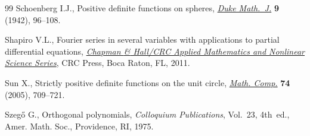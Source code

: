 \documentclass[pdftex]{sigma}
\numberwithin{equation}{section}
\begin{document}
\begin{thebibliography}{99}
Schoenberg I.J., Positive def\/inite functions on spheres, \href{http://dx.doi.org/10.1215/S0012-7094-42-00908-6}{\textit{Duke Math.~J.}}
 \textbf{9} (1942), 96--108.

Shapiro V.L., Fourier series in several variables with applications to partial
 dif\/ferential equations, \href{http://dx.doi.org/10.1201/b10811}{\textit{Chapman {\rm \&} Hall/CRC Applied Mathematics and Nonlinear
 Science Series}}, CRC Press, Boca Raton, FL, 2011.

Sun X., Strictly positive def\/inite functions on the unit circle, \href{http://dx.doi.org/10.1090/S0025-5718-04-01668-0}{\textit{Math.
 Comp.}} \textbf{74} (2005), 709--721.

Szeg{\H{o}} G., Orthogonal polynomials, \textit{Colloquium Publications},
 Vol.~23, 4th~ed., Amer. Math. Soc., Providence, RI, 1975.

\end{thebibliography}\LastPageEnding
\end{document}
